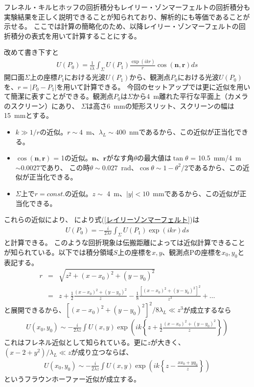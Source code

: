 \documentclass[a4paper,11pt,uplatex]{jsbook}
\begin{document}
フレネル・キルヒホッフの回折積分もレイリー・ゾンマーフェルトの回折積分も実験結果を正しく説明できることが知られており、解析的にも等価であることが示せる\cite{FToptics}。
ここでは計算の簡略化のため、以降レイリー・ゾンマーフェルトの回折積分の表式を用いて計算することにする。

改めて書き下すと
\begin{eqnarray}
  U(P_0) = \frac{1}{i\lambda}\int_{\Sigma} U(P_1)\frac{\exp(ikr)}{r}\cos(\bm{n},\bm{r})ds
\end{eqnarray}\label{レイリーゾンマーフェルト}
開口面$\Sigma$上の座標$P_1$における光波$U(P_1)$から、観測点$P_0$における光波$U(P_0)$を、$r = |P_0- P_1|$を用いて計算できる。
今回のセットアップでは更に近似を用いて簡潔に表すことができる。観測点$P_0$は$\Sigma$から4~m離れた平行な平面上（カメラのスクリーン）にあり、
$\Sigma$は高さ6~mmの矩形スリット、スクリーンの幅は15~mmとする。
\begin{itemize}
  \item $k \gg 1/r$の近似。$r\sim4$~m、$\lambda_L \sim 400$~nmであるから、この近似が正当化できる。
  \item $\cos(\bm{n},\bm{r})$ = 1の近似。$\bm{n}$、$\bm{r}$がなす角$\theta$の最大値は$\tan\theta$ = 10.5~mm/4~m $\sim 0.0027$であり、
  この時$\theta\sim 0.027$~rad、$\cos\theta \sim 1 - \theta^2/2$であるから、この近似が正当化できる。
  \item $\Sigma$上で$r = const.$の近似。$z\sim$ 4~m、$|y|<10$~mmであるから、この近似が正当化できる。
\end{itemize}
これらの近似により、
により式(\ref{レイリーゾンマーフェルト})は
\begin{eqnarray}
  U(P_0) = -\frac{i}{2\lambda r} \int_{\Sigma} U(P_1)\exp(ikr) ds
  \label{レイリーゾンマーフェルト近似}
\end{eqnarray}
と計算できる。
このような回折現象は伝搬距離によっては近似計算できることが知られている。以下では積分領域$S$上の座標を$x,y$、観測点Pの座標を$x_0,y_0$と表記する。
\begin{eqnarray}
  r &=& \sqrt{z^2 + (x-x_0)^2 + (y-y_0)^2}\\
  &=& z + \frac{1}{2}\frac{(x-x_0)^2 + (y-y_0)^2}{z} - \frac{1}{8}\frac{\left[(x-x_0)^2 + (y-y_0)^2\right]^2}{z^3} +\dots
\end{eqnarray}
と展開できるから、$\left[(x-x_0)^2 + (y-y_0)^2\right]^2/8\lambda_L \ll z^3$が成立するなら
\begin{eqnarray}
  U(x_0,y_0) \sim -\frac{i}{2\lambda z}\int U(x,y) \exp(ik\left\{z +\frac{1}{2}\frac{(x-x_0)^2 + (y-y_0)^2}{z}\right\})
\end{eqnarray}
これはフレネル近似として知られている。更に$z$が大きく、$(x-2 + y^2)/\lambda_L \ll z$が成り立つならば、
\begin{eqnarray}
  U(x_0,y_0) \sim -\frac{i}{2\lambda z}\int U(x,y) \exp(ik\left\{z -\frac{xx_0 + yy_0}{z}\right\})
\end{eqnarray}
というフラウンホーファー近似が成立する。
\end{document}
